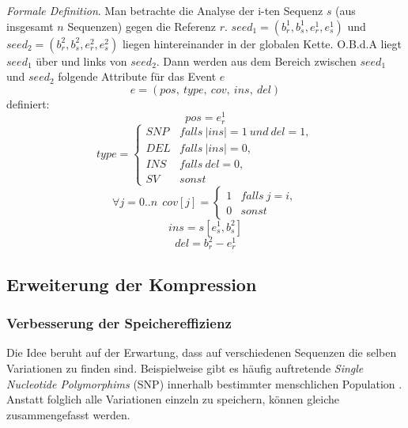 \documentclass[12pt]{article}
\begin{document}
\emph{Formale Definition}. Man betrachte die Analyse der i-ten Sequenz $s$ (aus insgesamt $n$ Sequenzen) gegen die Referenz $r$. $seed_{1} = (b^{1}_{r},b^{1}_{s},e^{1}_{r},e^{1}_{s})$ und $seed_{2}=(b^{2}_{r},b^{2}_{s},e^{2}_{r},e^{2}_{s})$ liegen hintereinander in der globalen Kette. O.B.d.A liegt $seed_{1}$ über und links von $seed_{2}$. Dann werden aus dem Bereich zwischen $seed_{1}$ und $seed_{2}$ folgende Attribute für das Event $e$ 
\begin{equation}
e = (pos,~type,~cov,~ins,~del)
\end{equation}
definiert:
\begin{equation}
pos = e^{1}_{r}
\end{equation}
\begin{equation}
type = 
\begin{cases}
SNP & falls~ |ins| = 1~ und~ del = 1, \\
DEL & falls~ |ins| = 0, \\
INS & falls~ del = 0, \\
SV  & sonst
\end{cases}
\end{equation}
\begin{equation}
\forall j=0..n ~~cov[j] = 
\begin{cases}
1 & falls~ j = i, \\
0 & sonst 
\end{cases}
\end{equation}
\begin{equation}
ins = s[e^{1}_{s},b^{2}_{s}]
\end{equation}
\begin{equation}
del = b^{2}_{r}-e^{1}_{r}
\end{equation}

\subsection{Erweiterung der Kompression}
\label{sec:evepro}

\subsubsection{Verbesserung der Speichereffizienz}
Die Idee beruht auf der Erwartung, dass auf verschiedenen Sequenzen die selben Variationen zu finden sind. Beispielweise gibt es häufig auftretende \textit{Single Nucleotide Polymorphims} (SNP) innerhalb bestimmter menschlichen Population \cite{INFO:snp_variation}. Anstatt folglich alle Variationen einzeln zu speichern, können gleiche zusammengefasst werden.
\end{document}
